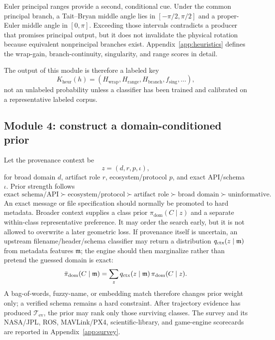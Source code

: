 \documentclass[11pt]{article}
\begin{document}
    Euler principal ranges provide a second, conditional cue. Under the common principal
    branch, a Tait--Bryan middle angle lies in $[-\pi/2,\pi/2]$ and a proper-Euler middle
    angle in $[0,\pi]$. Exceeding those intervals contradicts a producer that promises
    principal output, but it does not invalidate the physical rotation because equivalent
    nonprincipal branches exist. Appendix~\ref{app:heuristics} defines the wrap-gain,
    branch-continuity, singularity, and range scores in detail.

    The output of this module is therefore a labeled key
    \begin{equation}
        K_{\mathrm{heur}}(h)
        =(H_{\mathrm{wrap}},H_{\mathrm{range}},H_{\mathrm{branch}},f_{\mathrm{sing}},\ldots),
        \label{eq:focused-heur-key}
    \end{equation}
    not an unlabeled probability unless a classifier has been trained and calibrated on a
    representative labeled corpus.

    \subsection{Module 4: construct a domain-conditioned prior}

    Let the provenance context be
    \begin{equation}
        z=(d,r,p,\iota),
        \label{eq:focused-provenance}
    \end{equation}
    for broad domain $d$, artifact role $r$, ecosystem/protocol $p$, and exact API/schema
    $\iota$. Prior strength follows
    \begin{equation}
        \boxed{
            \text{exact schema/API}\succ
            \text{ecosystem/protocol}\succ
            \text{artifact role}\succ
            \text{broad domain}\succ
            \text{uninformative}.}
        \label{eq:focused-prior-order}
    \end{equation}
    An exact message or file specification should normally be promoted to hard metadata.
    Broader context supplies a class prior $\pi_{\mathrm{dom}}(C\mid z)$ and a separate
    within-class representative preference. It may order the search early, but it is not
    allowed to overwrite a later geometric loss. If provenance itself is uncertain, an
    upstream filename/header/schema classifier may return a distribution
    $q_{\rm ctx}(z\mid\mathfrak m)$ from metadata features $\mathfrak m$; the engine should then
    marginalize rather than pretend the guessed domain is exact:
    \begin{equation}
        \bar\pi_{\mathrm{dom}}(C\mid\mathfrak m)
        =\sum_z q_{\rm ctx}(z\mid\mathfrak m)\,\pi_{\mathrm{dom}}(C\mid z).
        \label{eq:focused-provenance-mixture}
    \end{equation}
    A bag-of-words, fuzzy-name, or embedding match therefore changes prior weight only; a
    verified schema remains a hard constraint. After trajectory evidence has produced
    $\mathcal T_{\mathrm{ev}}$, the prior may rank only those surviving classes. The survey
    and its NASA/JPL, ROS, MAVLink/PX4, scientific-library, and game-engine scorecards are
    reported in Appendix~\ref{app:survey}.
\end{document}
